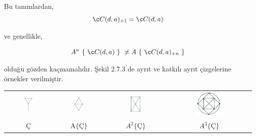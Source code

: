 \documentclass[11pt]{amsbook}
\begin{document}
Bu tanımlardan,
 \[
	Ç(d,a)_{+1} = Ç(d,a)\\
 \]

ve genellikle,
    
\[
	A^n \text{ \{ } Ç(d,a) \text{ \} }  \neq A \text{ \{ } Ç(d,a)_{+n} \text{ \}\\ } 
\]
   
olduğu gözden kaçmamalıdır. Şekil 2.7.3 de ayrıt ve katkılı ayrıt çizgelerine örnekler verilmiştir.\\

\begin{center}
	\begin{tabular}{cccc}
		\includegraphics[width=0.2\textwidth]{images/1}
		&
		\quad \includegraphics[width=0.195\textwidth]{images/2}
		&
		\quad \includegraphics[width=0.21\textwidth]{images/3}
		&
		\quad \includegraphics[width=0.34\textwidth]{images/4}\\

		Ç
		&
		\quad A$\{Ç\}$
		&
		\quad $A^2 \{Ç\}$
		&
		\quad $A^3 \{Ç\}$ \\
	\end{tabular}
\end{center}
\end{document}
